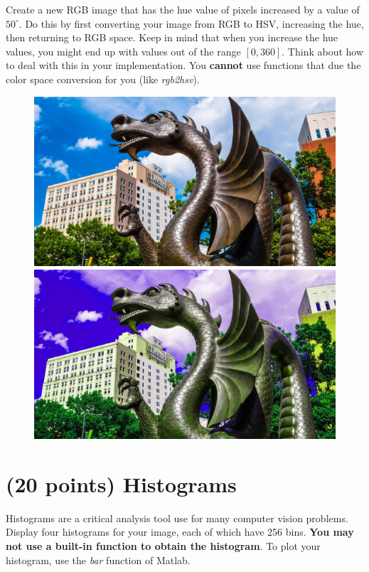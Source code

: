 \documentclass[12pt]{article}
\begin{document}
\noindent
Create a new RGB image that has the hue value of pixels increased by a value of $50^\circ$.  Do this by first converting your image from RGB to HSV, increasing the hue, then returning to RGB space.  Keep in mind that when you increase the hue values, you might end up with values out of the range $[0,360]$.   Think about how to deal with this in your implementation.  You \textbf{cannot} use functions that due the color space conversion for you (like \emph{rgb2hsv}).

\begin{figure}[htp]
    \centering
    \includegraphics[width=14cm]{input_1.jpg}
    \includegraphics[width=14cm]{hue_image.jpg}
\end{figure}

\newpage
\section{(20 points) Histograms}
Histograms are a critical analysis tool use for many computer vision problems.  Display four histograms for your image, each of which have 256 bins.  \textbf{You may not use a built-in function to obtain the histogram}.  To plot your histogram, use the \emph{bar} function of Matlab.
\end{document}
